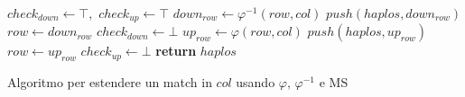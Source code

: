 \documentclass[a4paper,12pt, oneside]{book}
\begin{document}
\begin{algorithm}
  \begin{algorithmic}[1]
    \State $check_{down}\gets \top,\,\,check_{up}\gets \top$
    \State $down_{row}\gets \varphi^{-1}(row, col)$
    \State $push(haplos, down_{row})$
    \State $row \gets down_{row}$
    \Else
    \State $check_{down}\gets \bot$
    \EndIf
    \EndWhile
    \State $up_{row}\gets \varphi(row, col)$
    \State $push(haplos, up_{row})$
    \State $row \gets up_{row}$
    \Else
    \State $check_{up}\gets \bot$
    \EndIf
    \EndWhile
    \State \textbf{return} $haplos$
    \EndFunction
  \end{algorithmic}
  \caption{Algoritmo per estendere un match in $col$ usando $\varphi$,
  $\varphi^{-1}$ e MS} 
\end{algorithm}
\end{document}
